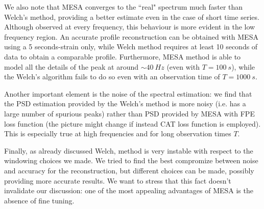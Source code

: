 \documentclass[twocolumn,showpacs,preprintnumbers,nofootinbib,prd,
superscriptaddress,10pt]{revtex4-1}
\begin{document}
We also note that MESA converges to the ``real" spectrum much faster than Welch's method, providing a better estimate even in the case of short time series. Although observed at every frequency, this behaviour is more evident in the low frequency region. An accurate profile reconstruction can be obtained with MESA using a 5 seconds-strain only, while Welch method requires at least 10 seconds of data to obtain a comparable profile.
Furthermore, MESA method is able to model all the details of the peak at around $\sim \SI{40}{Hz}$ (even with $T=\SI{100}{s}$), while the Welch's algorithm fails to do so even with an observation time of $T=\SI{1000}{s}$.

Another important element is the noise of the spectral estimation: we find that the PSD estimation provided by the Welch's method is more noisy (i.e. has a large number of spurious peaks) rather than PSD provided by MESA with FPE loss function (the picture might change if instead CAT loss function is employed). This is especially true at high frequencies and for long observation times $T$.

Finally, as already discussed Welch, method is very instable with respect to the windowing choices we made. We tried to find the best compromize between noise and accuracy for the reconstruction, but different choices can be made, possibly providing more accurate results. We want to stress that this fact doesn't invalidate our discussion: one of the most appealing advantages of MESA is the absence of fine tuning.
\end{document}
